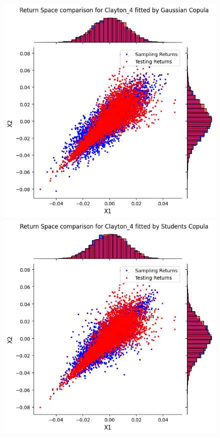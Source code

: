 \begin{figure}
    \centering
    \begin{minipage}{0.49\textwidth}
        \centering
        \includegraphics[width=\textwidth]{5ResultsDiscussion/pictures/PortfolioTest/Port4Gauss.png}
    \end{minipage}
    \hfill
    \begin{minipage}{0.49\textwidth}
        \centering
        \includegraphics[width=\textwidth]{5ResultsDiscussion/pictures/PortfolioTest/Port4Students.png}

\end{minipage}
\end{figure}
